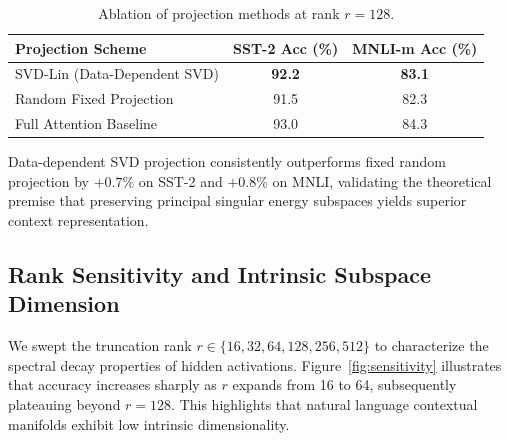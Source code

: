 \begin{table}[h]
\centering
\caption{Ablation of projection methods at rank $r=128$.}
\label{tab:ablation}
\begin{tabular}{lcc}
\toprule
\textbf{Projection Scheme} & \textbf{SST-2 Acc (\%)} & \textbf{MNLI-m Acc (\%)} \\
\midrule
SVD-Lin (Data-Dependent SVD) & \textbf{92.2} & \textbf{83.1} \\
Random Fixed Projection     & 91.5          & 82.3          \\
Full Attention Baseline     & 93.0          & 84.3          \\
\bottomrule
\end{tabular}
\end{table}

\noindent Data-dependent SVD projection consistently outperforms fixed random projection by $+0.7\%$ on SST-2 and $+0.8\%$ on MNLI, validating the theoretical premise that preserving principal singular energy subspaces yields superior context representation.

\subsection{Rank Sensitivity and Intrinsic Subspace Dimension}
We swept the truncation rank $r \in \{16, 32, 64, 128, 256, 512\}$ to characterize the spectral decay properties of hidden activations. Figure~\ref{fig:sensitivity} illustrates that accuracy increases sharply as $r$ expands from 16 to 64, subsequently plateauing beyond $r=128$. This highlights that natural language contextual manifolds exhibit low intrinsic dimensionality.

